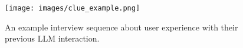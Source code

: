 \begin{figure}[t]
    \centering
    \vspace{-0.1cm}
    \texttt{[image: images/clue\_example.png]}
      \caption{An example interview sequence about user experience with their previous LLM interaction.}\label{fig:mov}
      \vspace{-0.5cm}
\end{figure}